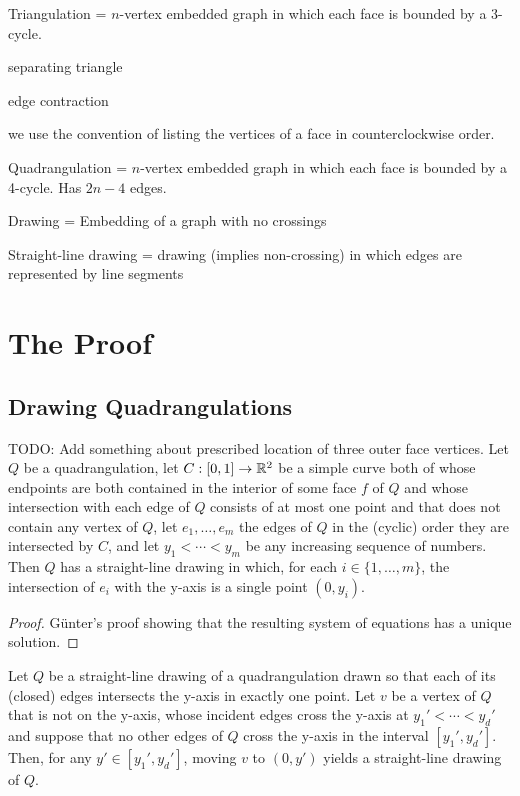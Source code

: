 \documentclass{patmorin}
\begin{document}
Triangulation = $n$-vertex embedded graph in which each face is bounded by a 3-cycle.

separating triangle

edge contraction

we use the convention of listing the vertices of a face in counterclockwise order.

Quadrangulation = $n$-vertex embedded graph in which each face is bounded by a 4-cycle. Has $2n-4$ edges.

Drawing = Embedding of a graph with no crossings

Straight-line drawing = drawing (implies non-crossing) in which edges are represented by line segments 


\section{The Proof}

\subsection{Drawing Quadrangulations}

\begin{lem}
    TODO: Add something about prescribed location of three outer face vertices.
    Let $Q$ be a quadrangulation, let $C:[0,1]\to\mathbb{R}^2$ be a simple curve
   both of whose endpoints are both contained in the interior of some
   face $f$ of $Q$ and whose intersection with each edge of $Q$ consists
   of at most one point and that does not contain
    any vertex of $Q$, let $e_1,\ldots,e_m$ the edges of $Q$ in the
    (cyclic) order they are intersected by $C$, and let $y_1<\cdots<y_m$
    be any increasing sequence of numbers.  Then $Q$ has a straight-line
    drawing in which, for each $i\in\{1,\ldots,m\}$, the intersection
    of $e_i$ with the y-axis is a single point $(0,y_i)$.
\end{lem}

\begin{proof}
   G\"unter's proof showing that the resulting system of equations has a unique solution.
\end{proof}

\begin{lem}
   Let $Q$ be a straight-line drawing of a quadrangulation drawn so
   that each of its (closed) edges intersects the y-axis in exactly one
   point. Let $v$ be a vertex of $Q$ that is not on the y-axis, whose
   incident edges cross the y-axis at $y_1'<\cdots<y_d'$ and suppose that
   no other edges of $Q$ cross the y-axis in the interval $[y_1',y_d']$.
   Then, for any $y'\in[y_1',y_d']$, moving $v$ to $(0,y')$ yields a
   straight-line drawing of $Q$.
\end{lem}
\end{document}
